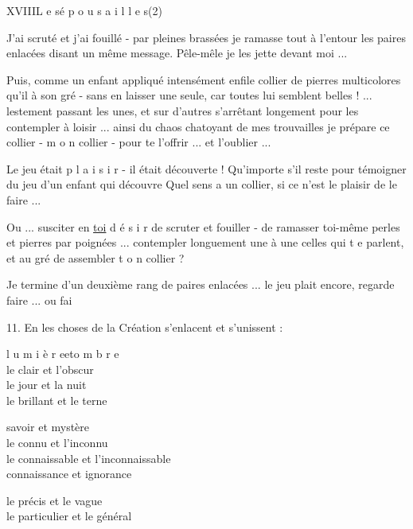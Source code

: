 XVIII\qquad L e s\quad é p o u s a i l l e s\qquad (2)

J'ai scruté et j'ai fouillé - par pleines brassées je ramasse tout à l'entour les paires enlacées disant un même message. Pêle-mêle je les jette devant moi ...

Puis, comme un enfant appliqué intensément enfile collier de pierres multicolores qu'il  à son gré - sans en laisser une seule, car toutes lui semblent belles ! ... lestement passant les unes, et sur d'autres s'arrêtant longement pour les contempler à loisir ... ainsi du chaos chatoyant de mes trouvailles je prépare ce collier - m o n collier - pour te l'offrir ... et  l'oublier ...

Le jeu était p l a i s i r - il était découverte ! Qu'importe s'il reste   pour témoigner du jeu  d'un enfant qui découvre \unsure{!} Quel sens a un collier, si ce n'est le plaisir de le faire ...

Ou ... susciter en \uline{toi} d é s i r de scruter et fouiller - de ramasser toi-même perles et pierres par poignées ... contempler longuement une à une celles qui t e  parlent, et au gré de    assembler t o n collier ?


Je termine d'un deuxième rang de paires enlacées ...  le jeu  plait encore,  regarde faire ... ou  fai 

11. En les choses de la Création s'enlacent et s'unissent :

\begin{flushleft}
l u m i è r e\quad et\quad o m b r e\\
le clair et l'obscur\\
le jour et la nuit\\
le brillant et le terne

savoir et mystère\\
le connu et l'inconnu\\
le connaissable et l'inconnaissable\\
connaissance et ignorance

le précis et le vague\\
le particulier et le général
\end{flushleft}

